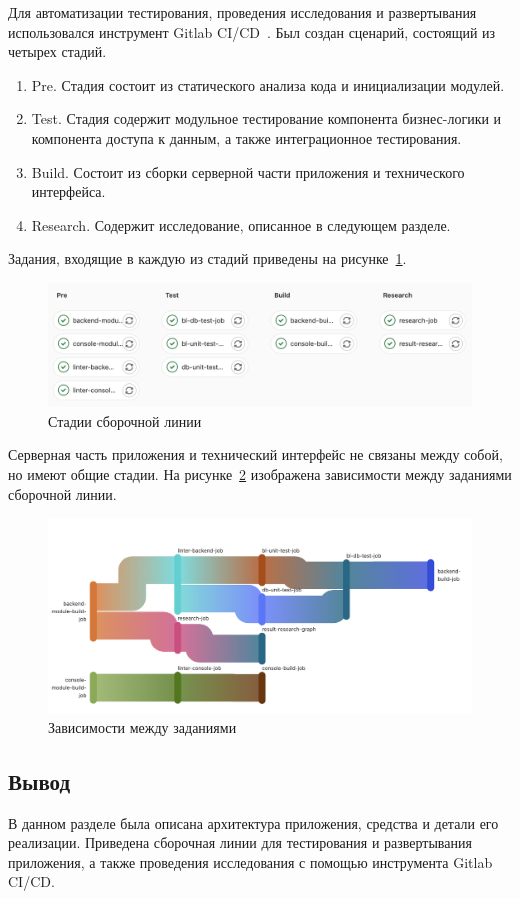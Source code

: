 Для автоматизации тестирования, проведения исследования и развертывания использовался инструмент Gitlab CI/CD~\cite{ci}. Был создан сценарий, состоящий из четырех стадий. 
\begin{enumerate}[label=\arabic*)]
	\item Pre. Стадия состоит из статического анализа кода и инициализации модулей. 
	\item Test. Стадия содержит модульное тестирование компонента бизнес-логики и компонента доступа к данным, а также интеграционное тестирования.
	\item Build. Состоит из сборки серверной части приложения и технического интерфейса.
	\item Research. Содержит исследование, описанное в следующем разделе.
\end{enumerate}
Задания, входящие в каждую из стадий приведены на рисунке~\ref{stages}. 
\begin{figure}[!h]
	\centering
	\includegraphics[width=\textwidth]{image/stages}
	\caption{Стадии сборочной линии}
	\label{stages}
\end{figure}

Серверная часть приложения и технический интерфейс не связаны между собой, но имеют общие стадии. На рисунке~\ref{needs} изображена зависимости между заданиями сборочной линии. 
\begin{figure}[!h]
	\centering
	\includegraphics[width=\textwidth]{image/needs}
	\caption{Зависимости между заданиями}
	\label{needs}
\end{figure}

\subsection*{Вывод}
В данном разделе была описана архитектура приложения, средства и детали его реализации. Приведена сборочная линии для тестирования и развертывания приложения, а также проведения исследования с помощью инструмента Gitlab CI/CD.

